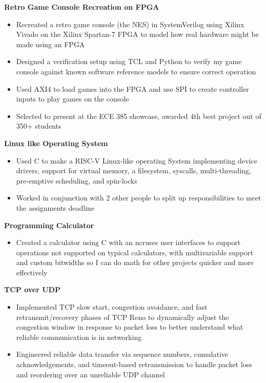 \documentclass[11pt]{article} %
\begin{document}
\textbf{Retro Game Console Recreation on FPGA} \\
\vspace{-9pt}
\begin{itemize}
  \item Recreated a retro game console (the NES) in SystemVerilog using Xilinx Vivado on the Xilinx Spartan-7 FPGA to model how real hardware might be made using an FPGA
  \item Designed a verification setup using TCL and Python to verify my game console against known software reference models to ensure correct operation
  \item Used AXI4 to load games into the FPGA and use SPI to create controller inputs to play games on the console
  \item Selected to present at the ECE 385 showcase, awarded 4th best project out of 350+ students
\end{itemize}


\textbf{Linux like Operating System} \\
\vspace{-9pt}
\begin{itemize}
    \item Used C to make a RISC-V Linux-like operating System implementing device drivers, support for virtual memory, a filesystem, syscalls, multi-threading, pre-emptive scheduling, and spin-locks
    \item Worked in conjunction with 2 other people to split up responsibilities to meet the 
        assignments deadline

\end{itemize}
\textbf{Programming Calculator} \\
\vspace{-9pt}
\begin{itemize}
  \item Created a calculator using C with an ncruses user interfaces to support operations not supported on
      typical calculators, with multivariable support and custom bitwidths
      so I can do math for other projects quicker and more effectively
\end{itemize}

\textbf{TCP over UDP} \\
\vspace{-9pt}
\begin{itemize}
  \item Implemented TCP  slow start, congestion avoidance, and fast retransmit/recovery phases of TCP Reno to dynamically adjust the congestion window in response to packet loss to better understand what reliable communication is in networking
  \item Engineered reliable data transfer via sequence numbers, cumulative acknowledgements, and timeout-based retransmission to handle packet loss and reordering over an unreliable UDP channel
\end{itemize}
\end{document}
